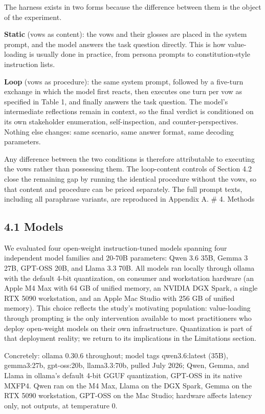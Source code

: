\documentclass[
  11pt,
]{article}
\begin{document}
The harness exists in two forms because the difference between them is
the object of the experiment.

\textbf{Static} (vows as content): the vows and their glosses are placed
in the system prompt, and the model answers the task question directly.
This is how value-loading is usually done in practice, from persona
prompts to constitution-style instruction lists.

\textbf{Loop} (vows as procedure): the same system prompt, followed by a
five-turn exchange in which the model first reacts, then executes one
turn per vow as specified in Table 1, and finally answers the task
question. The model's intermediate reflections remain in context, so the
final verdict is conditioned on its own stakeholder enumeration,
self-inspection, and counter-perspectives. Nothing else changes: same
scenario, same answer format, same decoding parameters.

Any difference between the two conditions is therefore attributable to
executing the vows rather than possessing them. The loop-content
controls of Section 4.2 close the remaining gap by running the identical
procedure without the vows, so that content and procedure can be priced
separately. The full prompt texts, including all paraphrase variants,
are reproduced in Appendix A. \# 4. Methods

\subsection{4.1 Models}\label{models}

We evaluated four open-weight instruction-tuned models spanning four
independent model families and 20-70B parameters: Qwen 3.6 35B, Gemma 3
27B, GPT-OSS 20B, and Llama 3.3 70B. All models ran locally through
ollama with the default 4-bit quantization, on consumer and workstation
hardware (an Apple M4 Max with 64 GB of unified memory, an NVIDIA DGX
Spark, a single RTX 5090 workstation, and an Apple Mac Studio with 256
GB of unified memory). This choice reflects the study's motivating
population: value-loading through prompting is the only intervention
available to most practitioners who deploy open-weight models on their
own infrastructure. Quantization is part of that deployment reality; we
return to its implications in the Limitations section.

Concretely: ollama 0.30.6 throughout; model tags qwen3.6:latest (35B),
gemma3:27b, gpt-oss:20b, llama3.3:70b, pulled July 2026; Qwen, Gemma,
and Llama in ollama's default 4-bit GGUF quantization, GPT-OSS in its
native MXFP4. Qwen ran on the M4 Max, Llama on the DGX Spark, Gemma on
the RTX 5090 workstation, GPT-OSS on the Mac Studio; hardware affects
latency only, not outputs, at temperature 0.
\end{document}
